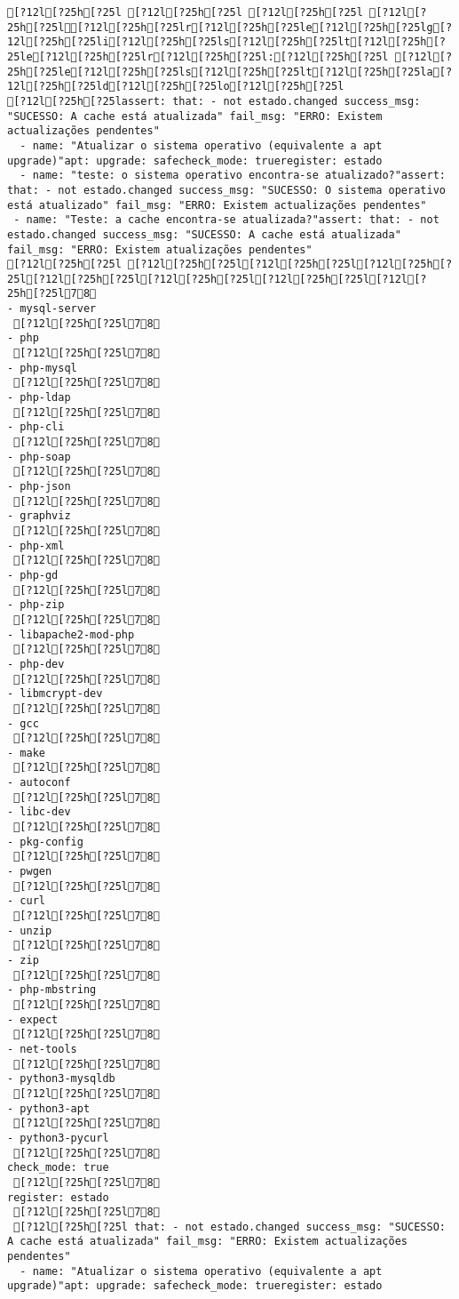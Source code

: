 \documentclass{scrartcl}
\begin{document}
\begin{Verbatim}
[?12l[?25h[?25l [?12l[?25h[?25l [?12l[?25h[?25l [?12l[?25h[?25l[?12l[?25h[?25lr[?12l[?25h[?25le[?12l[?25h[?25lg[?12l[?25h[?25li[?12l[?25h[?25ls[?12l[?25h[?25lt[?12l[?25h[?25le[?12l[?25h[?25lr[?12l[?25h[?25l:[?12l[?25h[?25l [?12l[?25h[?25le[?12l[?25h[?25ls[?12l[?25h[?25lt[?12l[?25h[?25la[?12l[?25h[?25ld[?12l[?25h[?25lo[?12l[?25h[?25l
[?12l[?25h[?25lassert: that: - not estado.changed success_msg: "SUCESSO: A cache está atualizada" fail_msg: "ERRO: Existem actualizações pendentes"
  - name: "Atualizar o sistema operativo (equivalente a apt upgrade)"apt: upgrade: safecheck_mode: trueregister: estado
  - name: "teste: o sistema operativo encontra-se atualizado?"assert: that: - not estado.changed success_msg: "SUCESSO: O sistema operativo está atualizado" fail_msg: "ERRO: Existem actualizações pendentes"
 - name: "Teste: a cache encontra-se atualizada?"assert: that: - not estado.changed success_msg: "SUCESSO: A cache está atualizada" fail_msg: "ERRO: Existem atualizações pendentes"
[?12l[?25h[?25l [?12l[?25h[?25l[?12l[?25h[?25l[?12l[?25h[?25l[?12l[?25h[?25l[?12l[?25h[?25l[?12l[?25h[?25l[?12l[?25h[?25l78
- mysql-server
 [?12l[?25h[?25l78
- php
 [?12l[?25h[?25l78
- php-mysql
 [?12l[?25h[?25l78
- php-ldap
 [?12l[?25h[?25l78
- php-cli
 [?12l[?25h[?25l78
- php-soap
 [?12l[?25h[?25l78
- php-json
 [?12l[?25h[?25l78
- graphviz
 [?12l[?25h[?25l78
- php-xml
 [?12l[?25h[?25l78
- php-gd
 [?12l[?25h[?25l78
- php-zip
 [?12l[?25h[?25l78
- libapache2-mod-php
 [?12l[?25h[?25l78
- php-dev
 [?12l[?25h[?25l78
- libmcrypt-dev
 [?12l[?25h[?25l78
- gcc
 [?12l[?25h[?25l78
- make
 [?12l[?25h[?25l78
- autoconf
 [?12l[?25h[?25l78
- libc-dev
 [?12l[?25h[?25l78
- pkg-config
 [?12l[?25h[?25l78
- pwgen
 [?12l[?25h[?25l78
- curl
 [?12l[?25h[?25l78
- unzip
 [?12l[?25h[?25l78
- zip
 [?12l[?25h[?25l78
- php-mbstring
 [?12l[?25h[?25l78
- expect
 [?12l[?25h[?25l78
- net-tools
 [?12l[?25h[?25l78
- python3-mysqldb
 [?12l[?25h[?25l78
- python3-apt
 [?12l[?25h[?25l78
- python3-pycurl
 [?12l[?25h[?25l78
check_mode: true
 [?12l[?25h[?25l78
register: estado
 [?12l[?25h[?25l78
 [?12l[?25h[?25l that: - not estado.changed success_msg: "SUCESSO: A cache está atualizada" fail_msg: "ERRO: Existem actualizações pendentes"
  - name: "Atualizar o sistema operativo (equivalente a apt upgrade)"apt: upgrade: safecheck_mode: trueregister: estado

\end{Verbatim}
\end{document}
